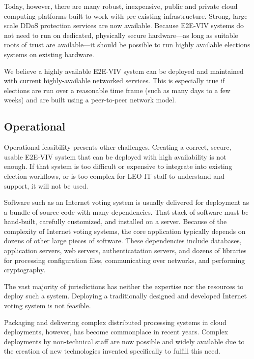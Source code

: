 Today, however, there are many robust, inexpensive, public and private
cloud computing platforms built to work with pre-existing
infrastructure. Strong, large-scale DDoS protection services are now
available. Because E2E-VIV systems do not need to run on dedicated,
physically secure hardware---as long as suitable roots of trust are
available---it should be possible to run highly available elections
systems on existing hardware.

We believe a highly available E2E-VIV system can be deployed and
maintained with current highly-available networked services. This is
especially true if elections are run over a reasonable time frame
(such as many days to a few weeks) and are built using a peer-to-peer
network model.

\subsection{Operational}
\label{sec:operational}

Operational feasibility presents other challenges. Creating a correct,
secure, usable E2E-VIV system that can be deployed with high
availability is not enough. If that system is too difficult or
expensive to integrate into existing election workflows, or is too
complex for LEO IT staff to understand and support, it will not be
used.

Software such as an Internet voting system is usually delivered for
deployment as a bundle of source code with many dependencies. That
stack of software must be hand-built, carefully customized, and
installed on a server.  Because of the complexity of Internet voting
systems, the core application typically depends on dozens of other
large pieces of software.  These dependencies include databases,
application servers, web servers, authenticatation servers, and dozens
of libraries for processing configuration files, communicating over
networks, and performing cryptography.

The vast majority of jurisdictions has neither the expertise nor the
resources to deploy such a system. Deploying a traditionally designed
and developed Internet voting system is not feasible.

Packaging and delivering complex distributed processing systems in
cloud deployments, however, has become commonplace in recent years.
Complex deployments by non-technical staff are now possible and widely
available due to the creation of new technologies invented
specifically to fulfill this need.

